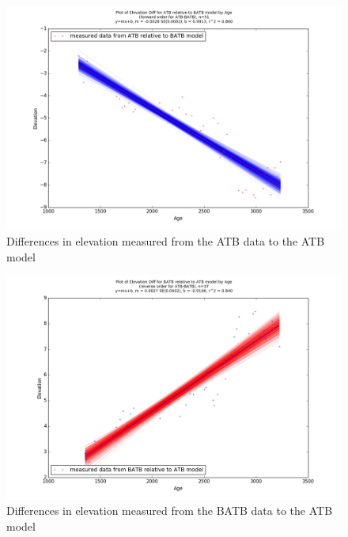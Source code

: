 \begin{figure}[h]
	\includegraphics[width=0.9\linewidth]{data/bothNonZero/withinSeventyFivePercent/gias/theGIA_ATB_relative_to_BATB.png}
	\caption{Differences in elevation measured from the ATB data to the ATB model}
	\label{fig:gias_ATBxBATB}
\end{figure}
\newpage


\begin{figure}[h]
	\includegraphics[width=0.9\linewidth]{data/bothNonZero/withinSeventyFivePercent/gias/theGIA_BATB_relative_to_ATB.png}
	\caption{Differences in elevation measured from the BATB data to the ATB model}
	\label{fig:gias_BATBxATB}
\end{figure}
\newpage




